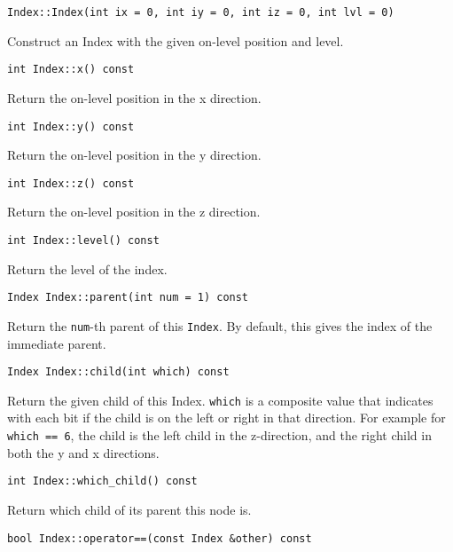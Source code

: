\begin{lstlisting}
Index::Index(int ix = 0, int iy = 0, int iz = 0, int lvl = 0)
\end{lstlisting}

Construct an Index with the given on-level position and level.

\begin{lstlisting}
int Index::x() const
\end{lstlisting}

Return the on-level position in the x direction.

\begin{lstlisting}
int Index::y() const
\end{lstlisting}

Return the on-level position in the y direction.

\begin{lstlisting}
int Index::z() const
\end{lstlisting}

Return the on-level position in the z direction.

\begin{lstlisting}
int Index::level() const
\end{lstlisting}

Return the level of the index.

\begin{lstlisting}
Index Index::parent(int num = 1) const
\end{lstlisting}

Return the \texttt{num}-th parent of this \texttt{Index}. By default, this
gives the index of the immediate parent.

\begin{lstlisting}
Index Index::child(int which) const
\end{lstlisting}

Return the given child of this Index. \texttt{which} is a composite value
that indicates with each bit if the child is on the left or right in that
direction. For example for \texttt{which == 6}, the child is the left child
in the z-direction, and the right child in both the y and x directions.

\begin{lstlisting}
int Index::which_child() const
\end{lstlisting}

Return which child of its parent this node is.

\begin{lstlisting}
bool Index::operator==(const Index &other) const
\end{lstlisting}

